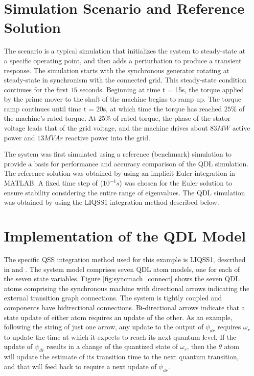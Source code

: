 \section{Simulation Scenario and Reference Solution}

The scenario is a typical simulation that initializes the system to steady-state at a specific operating point, and then adds a perturbation to produce a transient response. The simulation starts with the synchronous generator rotating at steady-state in synchronism with the connected grid. This steady-state condition continues for the first $15$ seconds. Beginning at time {t = 15s}, the torque applied by the prime mover to the shaft of the machine begins to ramp up. The torque ramp continues until time {t = 20s}, at which time the torque has reached $25\%$ of the machine’s rated torque. At $25\%$ of rated torque, the phase of the stator voltage leads that of the grid voltage, and the machine drives about $83 MW$ active power and $13 MVAr$ reactive power into the grid.

The system was first simulated using a reference (benchmark) simulation to provide a basis for performance and accuracy comparison of the QDL simulation. The reference solution was obtained by using an implicit Euler integration in MATLAB. A fixed time step of ($10^{-4} s$) was chosen for the Euler solution to ensure stability considering the entire range of eigenvalues. The QDL simulation was obtained by using the LIQSS1 integration method described below.

\section{Implementation of the QDL Model}

The specific QSS integration method used for this example is LIQSS1, described in \cite{pietro2018} and \cite{migoni2009}. The system model comprises seven QDL atom models, one for each of the seven state variables. Figure \ref{fig:syncmach_connect} shows the seven QDL atoms comprising the synchronous machine with directional arrows indicating the external transition graph connections. The system is tightly coupled and components have bidirectional connections. Bi-directional arrows indicate that a state update of either atom requires an update of the other. As an example, following the string of just one arrow, any update to the output of $\psi_{dr}$ requires $\omega_r$ to update the time at which it expects to reach its next quantum level. If the update of $\psi_{dr}$ results in a change of the quantized state of $\omega_r$, then the $\theta$ atom will update the estimate of its transition time to the next quantum transition, and that will feed back to require a next update of $\psi_{dr}$.

